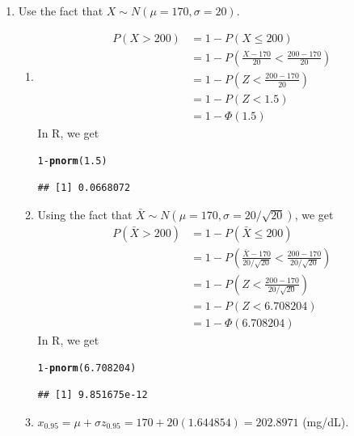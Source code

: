 \documentclass{article}\usepackage[]{graphicx}\usepackage[]{color}
\makeatletter
\newcommand{\hlnum}[1]{\textcolor[rgb]{0.686,0.059,0.569}{#1}}%
\newcommand{\hlopt}[1]{\textcolor[rgb]{0,0,0}{#1}}%
\newcommand{\hlstd}[1]{\textcolor[rgb]{0.345,0.345,0.345}{#1}}%
\newcommand{\hlkwd}[1]{\textcolor[rgb]{0.737,0.353,0.396}{\textbf{#1}}}%
\newenvironment{kframe}{%
 \def\at@end@of@kframe{}%
 \ifinner\ifhmode%
  \def\at@end@of@kframe{\end{minipage}}%
  \begin{minipage}{\columnwidth}%
 \fi\fi%
 \def\FrameCommand##1{\hskip\@totalleftmargin \hskip-\fboxsep
 \colorbox{shadecolor}{##1}\hskip-\fboxsep
     \hskip-\linewidth \hskip-\@totalleftmargin \hskip\columnwidth}%
 \MakeFramed {\advance\hsize-\width
   \@totalleftmargin\z@ \linewidth\hsize
   \@setminipage}}%
 {\par\unskip\endMakeFramed%
 \at@end@of@kframe}
\newenvironment{knitrout}{}{} %
\makeatother
\begin{document}
\begin{enumerate}
  \item Use the fact that $X \sim N\left(\mu = 170, \sigma = 20\right)$.
  \begin{enumerate}
    \item \begin{align*}
             P\left(X > 200\right) &= 1 - P\left(X \le 200\right) \\
             &= 1 - P\left(\frac{X - 170}{20} < \frac{200 - 170}{20}\right) \\
             &= 1 - P\left(Z < \frac{200 - 170}{20}\right) \\
             &= 1 - P\left(Z < 1.5\right) \\
             &= 1 - \Phi\left(1.5\right)
          \end{align*}
          In R, we get
\begin{knitrout}
\color{fgcolor}\begin{kframe}
\begin{alltt}
\hlnum{1} \hlopt{-} \hlkwd{pnorm}\hlstd{(}\hlnum{1.5}\hlstd{)}
\end{alltt}
\begin{verbatim}
## [1] 0.0668072
\end{verbatim}
\end{kframe}
\end{knitrout}
    \item Using the fact that $\bar{X} \sim N\left(\mu = 170, \sigma = 20 / \sqrt{20}\right)$, we get
      \begin{align*}
        P\left(\bar{X} > 200\right) &= 1 - P\left(\bar{X} \le 200\right) \\
          &= 1 - P\left(\frac{\bar{X} - 170}{20 / \sqrt{20}} < \frac{200 - 170}{20 / \sqrt{20}}\right) \\
          &= 1 - P\left(Z < \frac{200 - 170}{20 / \sqrt{20}}\right) \\
          &= 1 - P\left(Z < 6.708204\right) \\
          &= 1 - \Phi\left(6.708204\right)
      \end{align*}
      In R, we get
\begin{knitrout}
\color{fgcolor}\begin{kframe}
\begin{alltt}
\hlnum{1} \hlopt{-} \hlkwd{pnorm}\hlstd{(}\hlnum{6.708204}\hlstd{)}
\end{alltt}
\begin{verbatim}
## [1] 9.851675e-12
\end{verbatim}
\end{kframe}
\end{knitrout}
      
    \item $x_{0.95} = \mu + \sigma z_{0.95} = 170 + 20 \left(1.644854\right) = 202.8971$ (mg/dL).
    
  \end{enumerate}
  
\end{enumerate}
\end{document}
